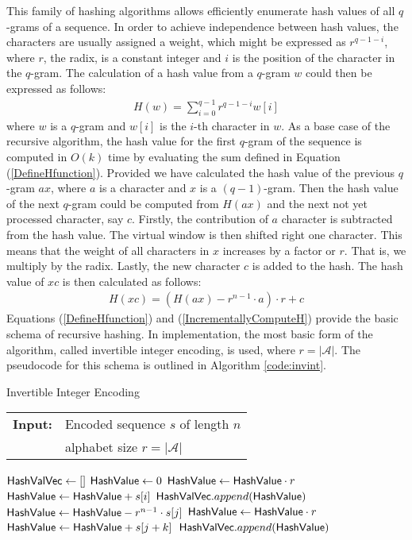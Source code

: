 This family of hashing algorithms allows efficiently enumerate hash values of all \(q\)-grams of a sequence. In order to achieve independence between hash values, the characters are usually assigned a weight, which might be expressed as $r^{q-1-i}$, where $r$, the radix, is a constant integer and $i$ is the position of the character in the $q$-gram. The calculation of a hash value from a \(q\)-gram \(w\) could then be expressed as follows:
\begin{align}
H(w) = \sum_{i=0}^{q-1}r^{q-1-i}w[i]\label{DefineHfunction}
\end{align}
where $w$ is a \(q\)-gram and $w[i]$ is the $i$-th character in $w$.
As a base case of the recursive algorithm, the hash value for the
first $q$-gram of the sequence is computed in \(O(k)\) time by evaluating
the sum defined in Equation (\ref{DefineHfunction}).
Provided we have calculated the hash value of the previous $q$-gram
\(ax\), where \(a\) is a character and \(x\) is a \((q-1)\)-gram.
Then the hash value
of the next \(q\)-gram could be computed from \(H(ax)\) and the next not yet
processed character, say \(c\). Firstly, the contribution of \(a\)
character is subtracted from the hash value. The virtual window is then
shifted right one character. This means that the weight of all characters
in \(x\) increases by a factor or \(r\). That is, we multiply by the radix.
Lastly, the new character \(c\) is added to the hash.
The hash value of \(xc\) is then calculated as follows:
\begin{align}
H(xc) = (H(ax)-r^{n-1}\cdot a)\cdot r+c\label{IncrementallyComputeH}
\end{align}
Equations (\ref{DefineHfunction}) and (\ref{IncrementallyComputeH})
provide the basic schema of recursive hashing. In implementation, the most basic form of the algorithm, called invertible integer encoding, is used, where \(r=|\mathcal{A}|\). The pseudocode for this schema is
outlined in Algorithm \ref{code:invint}.
\begin{algorithm}[t]
\caption{Invertible Integer Encoding}
\label{code:invint}
\begin{tabular}{@{}l@{~}l}
\textbf{Input:}&Encoded sequence $s$ of length $n$\\
               &alphabet size \(r=|\mathcal{A}|\)\\
\end{tabular}
\begin{algorithmic}
\State \(\mathsf{HashValVec}\gets []\)
\State \(\mathsf{HashValue} \gets 0\)
\State \(\mathsf{HashValue} \gets \mathsf{HashValue} \cdot r\)
\State \(\mathsf{HashValue} \gets \mathsf{HashValue} + s[i]\)
\EndFor
\State \(\mathsf{HashValVec} .append(\mathsf{HashValue})\)
\State \(\mathsf{HashValue} \gets \mathsf{HashValue} - r^{n-1}\cdot s[j]\)
\State \(\mathsf{HashValue} \gets \mathsf{HashValue} \cdot r\)
\State \(\mathsf{HashValue} \gets \mathsf{HashValue} + s[j+k]\)\
\State \(\mathsf{HashValVec} .append(\mathsf{HashValue})\)
\EndFor
\end{algorithmic}
\end{algorithm}

